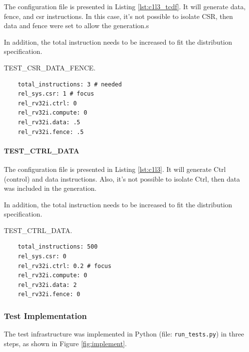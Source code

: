 The configuration file is presented in Listing \ref{lst:c1l3_tcdf}. It will generate data, fence, and csr instructions. In this case, it's not possible to isolate CSR, then data and fence were set to allow the generation.s

In addition, the total instruction needs to be increased to fit the distribution specification.

\begin{listing}[ht]
\caption{TEST\_CSR\_DATA\_FENCE.}
\label{lst:c1l3_tcdf}
\begin{verbatim}
    total_instructions: 3 # needed
    rel_sys.csr: 1 # focus
    rel_rv32i.ctrl: 0
    rel_rv32i.compute: 0 
    rel_rv32i.data: .5
    rel_rv32i.fence: .5
\end{verbatim}
\end{listing}

\paragraph{TEST\_CTRL\_DATA}

The configuration file is presented in Listing \ref{lst:c1l3}. It will generate Ctrl (control) and data instructions. Also, it's not possible to isolate Ctrl, then data was included in the generation.

In addition, the total instruction needs to be increased to fit the distribution specification.

\begin{listing}[h!]
\caption{TEST\_CTRL\_DATA.}
\label{lst:c1l3}
\begin{verbatim}
    total_instructions: 500
    rel_sys.csr: 0 
    rel_rv32i.ctrl: 0.2 # focus
    rel_rv32i.compute: 0 
    rel_rv32i.data: 2
    rel_rv32i.fence: 0
    \end{verbatim}
\end{listing}

\subsubsection{Test Implementation}

The test infrastructure was implemented in Python (file: \texttt{run\_tests.py}) in three steps, as shown in Figure \ref{fig:implement}.

